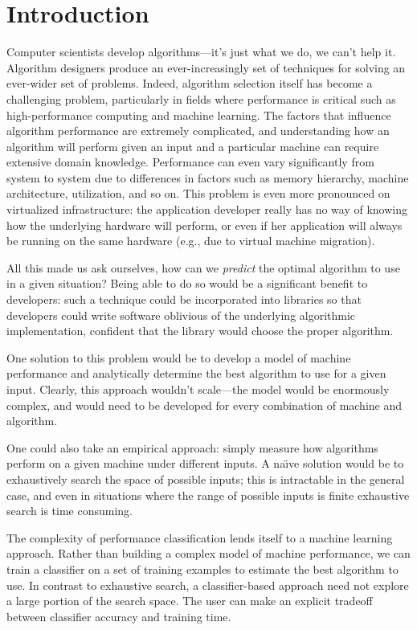 \section{Introduction}
Computer scientists develop algorithms---it's just what we do, we can't help it.
Algorithm designers produce an ever-increasingly set of techniques for solving an ever-wider set of problems.
Indeed, algorithm selection itself has become a challenging problem, particularly in fields where performance is critical such as high-performance computing and machine learning.
The factors that influence algorithm performance are extremely complicated, and understanding how an algorithm will perform given an input and a particular machine can require extensive domain knowledge.
Performance can even vary significantly from system to system due to differences in factors such as memory hierarchy, machine architecture, utilization, and so on.
This problem is even more pronounced on virtualized infrastructure: the application developer really has no way of knowing how the underlying hardware will perform, or even if her application will always be running on the same hardware (e.g., due to virtual machine migration).

All this made us ask ourselves, how can we \emph{predict} the optimal algorithm to use in a given situation?
Being able to do so would be a significant benefit to developers: such a technique could be incorporated into libraries so that developers could write software oblivious of the underlying algorithmic implementation, confident that the library would choose the proper algorithm.

One solution to this problem would be to develop a model of machine performance and analytically determine the best algorithm to use for a given input.
Clearly, this approach wouldn't scale---the model would be enormously complex, and would need to be developed for every combination of machine and algorithm.

One could also take an empirical approach: simply measure how algorithms perform on a given machine under different inputs.
A na\"{\i}ve solution would be to exhaustively search the space of possible inputs; this is intractable in the general case, and even in situations where the range of possible inputs is finite exhaustive search is time consuming.

The complexity of performance classification lends itself to a machine learning approach.
Rather than building a complex model of machine performance, we can train a classifier on a set of training examples to estimate the best algorithm to use.
In contrast to exhaustive search, a classifier-based approach need not explore a large portion of the search space.
The user can make an explicit tradeoff between classifier accuracy and training time.

